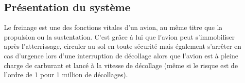 \begin{multicols}{2}
\section*{Présentation du système}
\ifprof
\else
Le freinage est une des fonctions vitales d’un avion, au même titre que la propulsion ou la sustentation. C’est grâce à lui que l’avion peut s’immobiliser après l’atterrissage, circuler
au sol en toute sécurité mais également s’arrêter en cas d’urgence lors d’une interruption de décollage alors que l’avion est à pleine charge de carburant et lancé à la vitesse de décollage (même si le risque est de l’ordre de 1 pour 1 million de décollages). 
%
%
%
%

\end{multicols}
